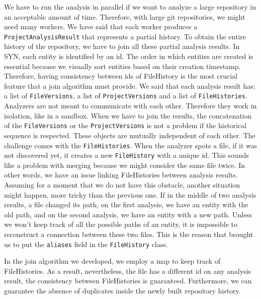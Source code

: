 \bigbreak
We have to run the analysis in parallel if we want to analyze a large repository in an acceptable amount of time. Therefore, with large git repositories, we might need many workers. We have said that each worker produces a \texttt{ProjectAnalysisResult} that represents a partial history. To obtain the entire history of the repository, we have to join all these partial analysis results. 
In SYN, each entity is identified by an id. 
The order in which entities are created is essential because we visually sort entities based on their creation timestamp. 
Therefore, having consistency between ids of FileHistory is the most crucial feature that a join algorithm must provide.
We said that each analysis result has: a list of \texttt{FileVersions}, a list of \texttt{ProjectVersions} and a list of \texttt{FileHistories}. 
Analyzers are not meant to communicate with each other. Therefore they work in isolation, like in a sandbox. 
When we have to join the results, the concatenation of the \texttt{FileVersions} or the \texttt{ProjectVersions} is not a problem if the historical sequence is respected. 
These objects are mutually independent of each other.
The challenge comes with the \texttt{FileHistories}. When the analyzer spots a file, if it was not discovered yet, it creates a new \texttt{FileHistory} with a unique id. 
This sounds like a problem with merging because we might consider the same file twice. In other words, we have an issue linking FileHistories between analysis results.
Assuming for a moment that we do not have this obstacle, another situation might happen, more tricky than the previous one. 
If in the middle of two analysis results, a file changed its path, on the first analysis, we have an entity with the old path, 
and on the second analysis, we have an entity with a new path. 
Unless we won't keep track of all the possible paths of an entity, it is impossible to reconstruct a connection between these two files. 
This is the reason that brought us to put the \texttt{aliases} field in the \texttt{FileHistory} class. 

In the join algorithm we developed, we employ a map to keep track of FileHistories.
As a result, nevertheless, the file has a different id on any analysis result, the consistency between
FileHistories is guaranteed. Furthermore, we can guarantee the absence of duplicates inside the newly built repository history. 

